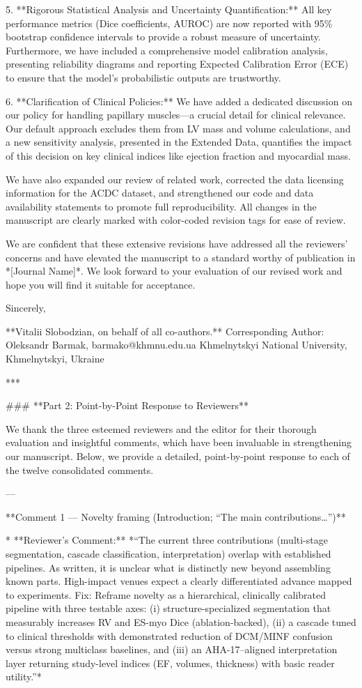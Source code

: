 5.  **Rigorous Statistical Analysis and Uncertainty Quantification:** All key performance metrics (Dice coefficients, AUROC) are now reported with 95\% bootstrap confidence intervals to provide a robust measure of uncertainty. Furthermore, we have included a comprehensive model calibration analysis, presenting reliability diagrams and reporting Expected Calibration Error (ECE) to ensure that the model’s probabilistic outputs are trustworthy.

6.  **Clarification of Clinical Policies:** We have added a dedicated discussion on our policy for handling papillary muscles—a crucial detail for clinical relevance. Our default approach excludes them from LV mass and volume calculations, and a new sensitivity analysis, presented in the Extended Data, quantifies the impact of this decision on key clinical indices like ejection fraction and myocardial mass.

We have also expanded our review of related work, corrected the data licensing information for the ACDC dataset, and strengthened our code and data availability statements to promote full reproducibility. All changes in the manuscript are clearly marked with color-coded revision tags for ease of review.

We are confident that these extensive revisions have addressed all the reviewers' concerns and have elevated the manuscript to a standard worthy of publication in *[Journal Name]*. We look forward to your evaluation of our revised work and hope you will find it suitable for acceptance.

Sincerely,

**Vitalii Slobodzian, on behalf of all co-authors.**
Corresponding Author: Oleksandr Barmak, barmako@khmnu.edu.ua
Khmelnytskyi National University, Khmelnytskyi, Ukraine

***

### **Part 2: Point-by-Point Response to Reviewers**

We thank the three esteemed reviewers and the editor for their thorough evaluation and insightful comments, which have been invaluable in strengthening our manuscript. Below, we provide a detailed, point-by-point response to each of the twelve consolidated comments.

---

**Comment 1 — Novelty framing (Introduction; “The main contributions…”)**

*   **Reviewer’s Comment:** *“The current three contributions (multi-stage segmentation, cascade classification, interpretation) overlap with established pipelines. As written, it is unclear what is distinctly new beyond assembling known parts. High-impact venues expect a clearly differentiated advance mapped to experiments. Fix: Reframe novelty as a hierarchical, clinically calibrated pipeline with three testable axes: (i) structure-specialized segmentation that measurably increases RV and ES-myo Dice (ablation-backed), (ii) a cascade tuned to clinical thresholds with demonstrated reduction of DCM/MINF confusion versus strong multiclass baselines, and (iii) an AHA-17–aligned interpretation layer returning study-level indices (EF, volumes, thickness) with basic reader utility.”*

